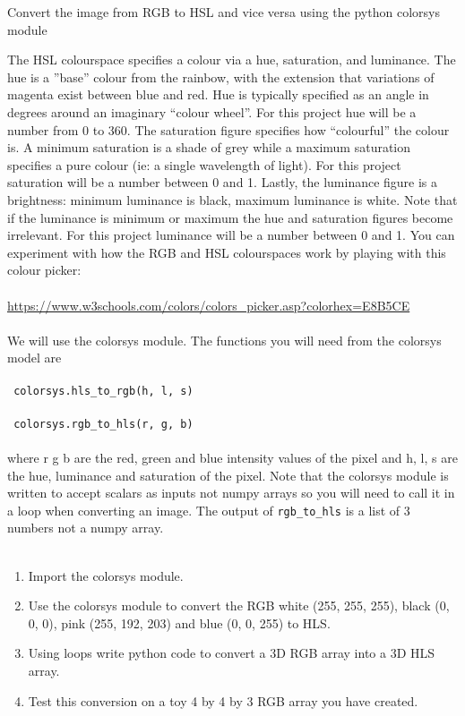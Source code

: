 \documentclass{lab}
\begin{document}
\begin{task}{Convert the image from RGB to HSL and vice versa using the python colorsys module}{}

The HSL colourspace speciﬁes a colour via a hue, saturation, and luminance. The hue is a ”base” colour from the rainbow, with the extension that variations of magenta exist between blue and red. Hue is typically speciﬁed as an angle in degrees around an imaginary “colour wheel”. For this project hue will be a number from 0 to 360.
The saturation ﬁgure speciﬁes how “colourful” the colour is. A minimum saturation is a shade of grey while a maximum saturation speciﬁes a pure colour (ie: a single wavelength of light). For this project saturation will be a number between 0 and 1.
Lastly, the luminance ﬁgure is a brightness: minimum luminance is black, maximum luminance is white. Note that if the luminance is minimum or maximum the hue and saturation ﬁgures become irrelevant. For this project luminance will be a number between 0 and 1.
You can experiment with how the RGB and HSL colourspaces work by playing with this colour picker: \\~\\ \url{https://www.w3schools.com/colors/colors_picker.asp?colorhex=E8B5CE} \\~\\
We will use the colorsys module. 
The functions you will need from the colorsys model are
\\~\\ \texttt{ colorsys.hls\_to\_rgb(h, l, s)} \\~\\
 \texttt{ colorsys.rgb\_to\_hls(r, g, b)} \\~\\
where r g b are the red, green and blue intensity values of the pixel and h, l, s are the hue, luminance and saturation of the pixel. Note that the colorsys module is written to accept scalars as inputs not numpy arrays so you will need to call it in a loop when converting an image. The output of  \texttt{rgb\_to\_hls}  is a list of 3 numbers not a numpy array. \\~


\begin{enumerate}
\item Import the colorsys module. 
\item Use the colorsys module to convert the RGB white (255, 255, 255), black (0, 0, 0), pink (255, 192, 203) and blue (0, 0, 255) to HLS.  
\item Using loops write python code to convert a 3D RGB array into a 3D HLS array. 
\item Test this conversion on a toy 4 by 4 by 3 RGB array you have created. 
\end{enumerate}

\end{task}
\end{document}
